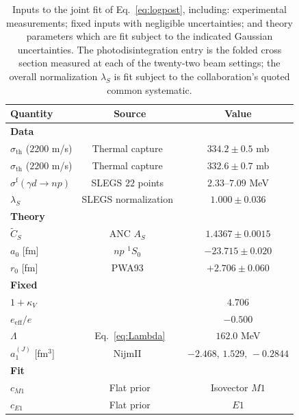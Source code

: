 \documentclass[
  aps,prd,twocolumn,nofootinbib,superscriptaddress,
  longbibliography,floatfix,preprintnumbers
]{revtex4-2}
\newcommand{\kappaV}{\kappa_{V}}
\newcommand{\Mone}{M1}
\newcommand{\Eone}{E1}
\newcommand{\sigth}{\sigma_{\mathrm{th}}}
\newcommand{\AS}{A_{S}}
\newcommand{\CSv}{\tilde{C}_{S}}
\begin{document}
\begin{table}[t]
  \centering
  {\scriptsize
  \begin{tabular}{lcc}
    \hline\hline
    Quantity & Source & Value \\
    \hline
    \multicolumn{3}{l}{\bf Data} \\
    $\sigth$ ($2200$ m/s)    & Thermal capture~\cite{Cox1965} & $334.2\pm0.5$ mb \\
    $\sigth$ ($2200$ m/s)    & Thermal capture~\cite{Cokinos:1977zz} & $332.6\pm0.7$ mb \\
    $\sigma^{\mathrm{f}}(\gamma d{\to}np)$ & SLEGS $22$ points~\cite{Chen:2025oyj} & $2.33$--$7.09$ MeV \\
    $\lambda_{S}$            & SLEGS normalization~\cite{Chen:2025oyj} & $1.000\pm0.036$ \\
    \hline
    \multicolumn{3}{l}{\bf Theory} \\
    $\CSv$                   & ANC $\AS$~\cite{deSwart:1995ui} & $1.4367\pm0.0015$ \\
    $a_{0}$ [fm]             & $np$ ${}^{1}S_{0}$~\cite{Stoks:1993tb} & $-23.715\pm0.020$ \\
    $r_{0}$ [fm]             & PWA93~\cite{Stoks:1993tb} & $+2.706\pm0.060$ \\
    \hline
    \multicolumn{3}{l}{\bf Fixed} \\
    $1+\kappaV$              & ~\cite{ParticleDataGroup:2024cfk} & $4.706$ \\
    $e_{\mathrm{eff}}/e$     & ~\cite{ParticleDataGroup:2024cfk} & $-0.500$ \\
    $\Lambda$                & Eq.~\eqref{eq:Lambda} & $162.0$ MeV \\
    $a_{1}^{(J)}$ [fm$^{3}$] & NijmII~\cite{PavonValderrama:2004se} & $-2.468,\,1.529,\,-0.2844$ \\
    \hline
    \multicolumn{3}{l}{\bf Fit} \\
    $c_{\Mone}$              & Flat prior        & Isovector $\Mone$ \\
    $c_{\Eone}$              & Flat prior        & $\Eone$  \\
    \hline\hline
  \end{tabular}}
  \caption{Inputs to the joint fit of Eq.~\eqref{eq:logpost}, including: experimental measurements; fixed inputs with negligible uncertainties;
 and theory parameters which are fit subject to the indicated Gaussian uncertainties. The
 photodisintegration entry is the folded cross section measured at each of the twenty-two
 beam settings; the overall normalization $\lambda_{S}$ is fit subject to the
 collaboration's quoted common systematic.}
  \label{tab:fitinputs}
\end{table}
\end{document}
